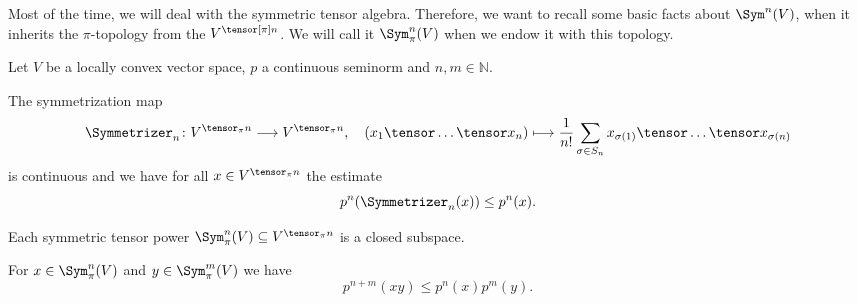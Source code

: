 Most of the time, we will deal with the symmetric tensor algebra. Therefore, 
we want to recall some basic facts about $\Sym^n(V)$, when it inherits the 
$\pi$-topology from the $V^{\tensor[\pi] n}$. We will call it 
$\Sym_{\pi}^n(V)$ when we endow it with this topology.
\begin{lemma}
	\label{Lemma:LCAna:ProjTensSymm}
	Let $V$ be a locally convex vector space, $p$ a continuous seminorm 
	and $n,m \in \mathbb{N}$.
	\begin{lemmalist}
		\item
		The symmetrization map
		\begin{equation*}
			\Symmetrizer_n
			\colon
			V^{\tensor_{\pi} n}
			\longrightarrow
			V^{\tensor_{\pi} n}
			, \quad
			(x_1 \tensor \ldots \tensor x_n)
			\longmapsto
			\frac{1}{n!}
			\sum\limits_{\sigma \in S_n}
			x_{\sigma(1)}
			\tensor \ldots \tensor
			x_{\sigma(n)}
		\end{equation*}
		is continuous and we have for all $x \in V^{\tensor_{\pi} n}$ 
		the estimate
		\begin{equation}
			\label{LCAna:SymmProdCont}
			p^n(\Symmetrizer_n(x))
			\leq
			p^n(x).
		\end{equation}
		
		\item
		Each symmetric tensor power $\Sym_{\pi}^n(V) \subseteq 
		V^{\tensor_{\pi} n}$ is a closed subspace.
		
		\item
		For $x \in \Sym_{\pi}^n(V)$ and $y \in \Sym_{\pi}^m(V)$ we have
		\begin{equation*}
			p^{n + m}(xy)
			\leq
			p^n(x) p^m(y).
		\end{equation*}
	\end{lemmalist}
\end{lemma}
